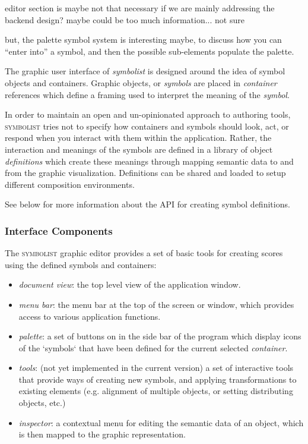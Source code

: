 \documentclass{article}
\def\symbolist{\textsc{symbolist}\xspace}
\begin{document}
editor section is maybe not that necessary if we are mainly addressing the backend design?
maybe could be too much information... not sure

but, the palette symbol system is interesting maybe, to discuss how you can ``enter into'' a symbol, and then the possible sub-elements populate the palette.


The graphic user interface of \textit{symbolist} is designed around the idea of symbol objects and containers. Graphic objects, or \textit{symbols} are placed in \textit{container} references which define a framing used to interpret the meaning of the \textit{symbol}.

In order to maintain an open and un-opinionated approach to authoring tools, \symbolist tries not to specify how containers and symbols should look, act, or respond when you interact with them within the application. Rather, the interaction and meanings of the symbols are defined in a library of object \textit{definitions} which create these meanings through mapping semantic data to and from the graphic visualization. Definitions can be shared and loaded to setup different composition environments.

See below for more information about the API for creating symbol definitions. 

\subsubsection{Interface Components}\label{subsec:interface_components}


The \symbolist graphic editor provides a set of basic tools for creating scores using the defined symbols and containers:
\begin{itemize}\itemsep0pt %
\item \textit{document view}: the top level view of the application window.
\item \textit{menu bar}: the menu bar at the top of the screen or window, which provides access to various application functions.
\item \textit{palette}: a set of buttons on in the side bar of the program which display icons of the `symbols` that have been defined for the current selected \textit{container}. 
\item \textit{tools}: (not yet implemented in the current version) a set of interactive tools that provide ways of creating new symbols, and applying transformations to existing elements (e.g. alignment of multiple objects, or setting distributing objects, etc.)
\item \textit{inspector}: a contextual menu for editing the semantic data of an object, which is then mapped to the graphic representation.
\end{itemize}
\end{document}
